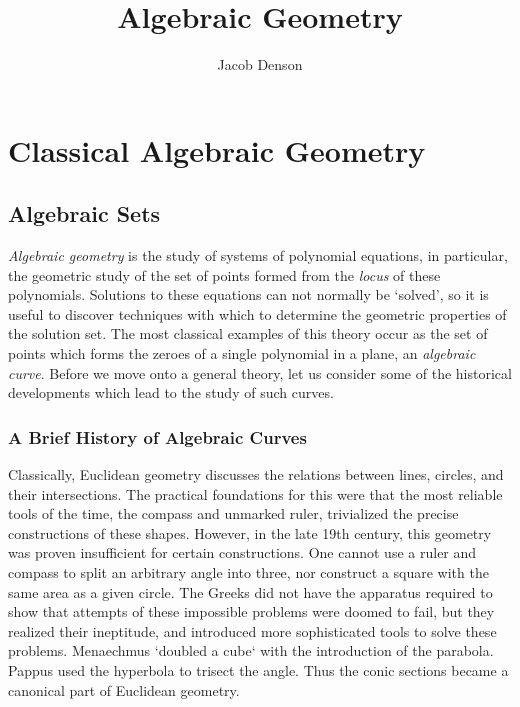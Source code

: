 

\title{Algebraic Geometry}
\author{Jacob Denson}



\maketitle
\tableofcontents
{}

\part{Classical Algebraic Geometry}

\chapter{Algebraic Sets}

\emph{Algebraic geometry} is the study of systems of polynomial equations, in particular, the geometric study of the set of points formed from the \emph{locus} of these polynomials. Solutions to these equations can not normally be `solved', so it is useful to discover techniques with which to determine the geometric properties of the solution set. The most classical examples of this theory occur as the set of points which forms the zeroes of a single polynomial in a plane, an \emph{algebraic curve}. Before we move onto a general theory, let us consider some of the historical developments which lead to the study of such curves.

\section{A Brief History of Algebraic Curves}

Classically, Euclidean geometry discusses the relations between lines, circles, and their intersections. The practical foundations for this were that the most reliable tools of the time, the compass and unmarked ruler, trivialized the precise constructions of these shapes. However, in the late 19th century, this geometry was proven insufficient for certain constructions. One cannot use a ruler and compass to split an arbitrary angle into three, nor construct a square with the same area as a given circle. The Greeks did not have the apparatus required to show that attempts of these impossible problems were doomed to fail, but they realized their ineptitude, and introduced more sophisticated tools to solve these problems. Menaechmus `doubled a cube` with the introduction of the parabola. Pappus used the hyperbola to trisect the angle. Thus the conic sections became a canonical part of Euclidean geometry.


